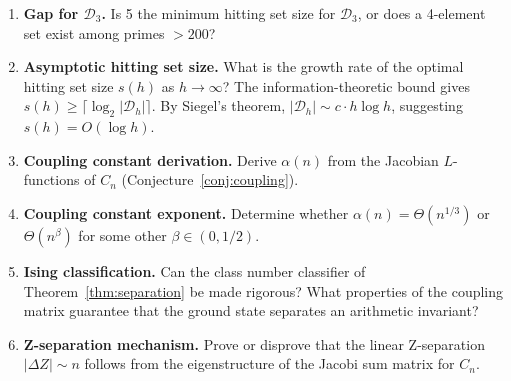 \documentclass[11pt]{amsart}
\theoremstyle{definition}
\begin{document}
\begin{enumerate}[label=\textbf{P\arabic*.}]
\item \textbf{Gap for $\mathcal{D}_3$.} Is 5 the minimum hitting set size for $\mathcal{D}_3$, or does a 4-element set exist among primes $> 200$?

\item \textbf{Asymptotic hitting set size.} What is the growth rate of the optimal hitting set size $s(h)$ as $h \to \infty$? The information-theoretic bound gives $s(h) \geq \lceil \log_2 |\mathcal{D}_h| \rceil$. By Siegel's theorem, $|\mathcal{D}_h| \sim c \cdot h \log h$, suggesting $s(h) = O(\log h)$.

\item \textbf{Coupling constant derivation.} Derive $\alpha(n)$ from the Jacobian $L$-functions of $C_n$ (Conjecture~\ref{conj:coupling}).

\item \textbf{Coupling constant exponent.} Determine whether $\alpha(n) = \Theta(n^{1/3})$ or $\Theta(n^{\beta})$ for some other $\beta \in (0, 1/2)$.

\item \textbf{Ising classification.} Can the class number classifier of Theorem~\ref{thm:separation} be made rigorous? What properties of the coupling matrix guarantee that the ground state separates an arithmetic invariant?

\item \textbf{Z-separation mechanism.} Prove or disprove that the linear Z-separation $|\Delta Z| \sim n$ follows from the eigenstructure of the Jacobi sum matrix for $C_n$.
\end{enumerate}


\end{document}
